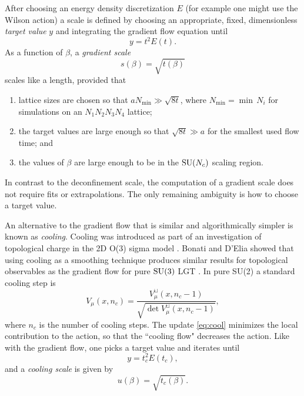 After choosing an energy density discretization $E$ (for example
one might use the Wilson action) a scale is defined by choosing an
appropriate, fixed, dimensionless {\it target value} $y$ and integrating
the gradient flow equation until 
\begin{equation}\label{eq:tardef}
  y=t^2 E(t).
\end{equation}
As a function of $\beta$, a {\it gradient scale}
\begin{equation}\label{eq:s}
  s(\beta)=\sqrt{t(\beta)}
\end{equation}
scales like a length, provided that
\begin{enumerate}
  \item lattice sizes are chosen so that $aN_{\min}\gg \sqrt{8t}$,
        where $N_{\min}=\min\,N_i$
        for simulations on an $N_1N_2N_3N_4$ lattice;
  \item the target values are large enough so that $\sqrt{8t}\gg a$ 
        for the smallest used flow time; and
  \item the values of $\beta$ are large enough to be in the
        $\operatorname{SU}(N_c)$ scaling region.
\end{enumerate}
In contrast to the deconfinement scale, the computation of 
a gradient scale does not require fits or extrapolations.
The only remaining ambiguity is how to choose a target value.

An alternative to the gradient flow that is similar and 
algorithmically simpler is known as {\it cooling}. 
Cooling was introduced as part of an investigation of
topological charge in the 2D O(3) sigma model \cite{berg_dislocations_1981}.
Bonati and D'Elia showed that using cooling as a smoothing technique produces
similar results for topological observables as the gradient flow
for pure $\operatorname{SU}(3)$ LGT \cite{bonati_comparison_2014}.
In pure SU(2) a standard cooling step is
\begin{equation}\label{eq:cool}
  V_\mu(x,n_c)=\frac{V^\sqcup_\mu(x,n_c-1)}
                    {\sqrt{\det V_\mu^\sqcup(x,n_c-1)}},
\end{equation}
where $n_c$ is the number of cooling steps. 
The update \eqref{eq:cool} minimizes the local contribution to the
action, so that the ``cooling flow" decreases the action. Like with
the gradient flow, one picks a target value and iterates 
 until
\begin{equation}
  y=t_c^2 E(t_c),
\end{equation}
and a {\it cooling scale} is given by
\begin{equation}\label{eq:u}
  u(\beta)=\sqrt{t_c(\beta)}.
\end{equation}


